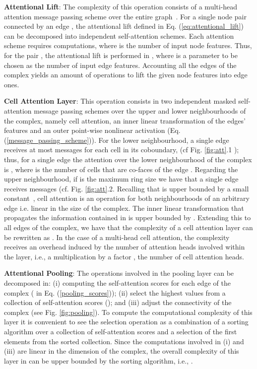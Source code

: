 \documentclass{article}
\begin{document}
\textbf{Attentional Lift}: The complexity of this operation consists of a multi-head attention message passing scheme over the entire graph~\cite{velivckovic2017graph}. For a single node pair  connected by an edge , the attentional lift defined in Eq. (\ref{eq:attentional_lift}) can be decomposed into  independent self-attention schemes. Each attention scheme requires  computations, where  is the number of input node features. Thus, for the pair , the attentional lift is performed in , where  is a parameter to be chosen as the number of input edge features. Accounting all the edges of the complex yields an amount of  operations to lift the given node features into edge ones.

\textbf{Cell Attention Layer}: This operation consists in two independent masked self-attention message passing schemes over the upper and lower neighbourhoods of the complex, namely cell attention, an inner linear transformation of the edges' features and an outer point-wise nonlinear activation (Eq.(\ref{message_passing_scheme})). For the lower neighbourhood, a single edge  receives at most  messages for each cell in its coboundary,  (cf Fig. \ref{fig:att}.1 ); thus, for a single edge the attention over the lower neighbourhood of the complex is , where  is the number of cells that are co-faces of the edge . Regarding the upper neighbourhood, if  is the maximum ring size we have that a single edge  receives  messages (cf. Fig. \ref{fig:att}.2. Recalling that  is upper bounded by a small constant~\cite{bodnarcwnet}, cell attention is an  operation for both neighbourhoods of an arbitrary edge  i.e. linear in the size of the complex. The inner linear transformation that propagates the information contained in  is upper bounded by . Extending this to all edges of the complex, we have that the complexity of a cell attention layer can be rewritten as . In the case of a multi-head cell attention, the complexity receives an overhead induced by the number of attention heads involved within the layer, i.e., a multiplication by a factor , the number of cell attention heads.
 

\textbf{Attentional Pooling}: The operations involved in the pooling layer can be decomposed in: (i) computing the self-attention scores for each edge of the complex ( in  Eq. (\ref{pooling_scores})); (ii) select the highest  values from a collection of self-attention scores (); and (iii) adjust the connectivity of the complex (see Fig. \ref{fig:pooling}). To compute the computational complexity of this layer it is convenient to see the selection operation as a combination of a sorting algorithm over a collection of self-attention scores and a selection of the first  elements from the sorted collection. Since the computations involved in (i) and (iii) are linear in the dimension of the complex, the overall complexity of this layer in can be upper bounded by the sorting algorithm, i.e., .
\end{document}
